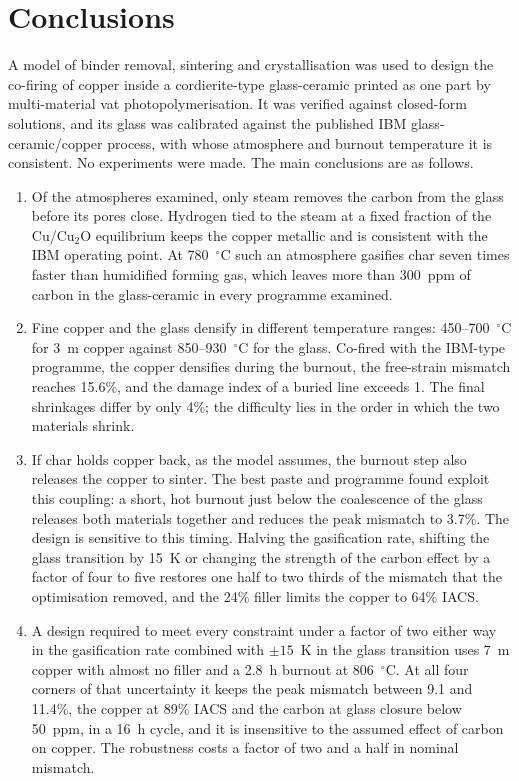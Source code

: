 \section{Conclusions}
\label{sec:conclusions}

A model of binder removal, sintering and crystallisation was used to design the co-firing of copper inside a cordierite-type glass-ceramic printed as one part by multi-material vat photopolymerisation. It was verified against closed-form solutions, and its glass was calibrated against the published IBM glass-ceramic/copper process, with whose atmosphere and burnout temperature it is consistent. No experiments were made. The main conclusions are as follows.

\begin{enumerate}
\item Of the atmospheres examined, only steam removes the carbon from the glass before its pores close. Hydrogen tied to the steam at a fixed fraction of the Cu/Cu$_2$O equilibrium keeps the copper metallic and is consistent with the IBM operating point. At 780~$^\circ$C such an atmosphere gasifies char seven times faster than humidified forming gas, which leaves more than 300~ppm of carbon in the glass-ceramic in every programme examined.
\item Fine copper and the glass densify in different temperature ranges: 450--700~$^\circ$C for 3~\textmu m copper against 850--930~$^\circ$C for the glass. Co-fired with the IBM-type programme, the copper densifies during the burnout, the free-strain mismatch reaches 15.6\%, and the damage index of a buried line exceeds 1. The final shrinkages differ by only 4\%; the difficulty lies in the order in which the two materials shrink.
\item If char holds copper back, as the model assumes, the burnout step also releases the copper to sinter. The best paste and programme found exploit this coupling: a short, hot burnout just below the coalescence of the glass releases both materials together and reduces the peak mismatch to 3.7\%. The design is sensitive to this timing. Halving the gasification rate, shifting the glass transition by 15~K or changing the strength of the carbon effect by a factor of four to five restores one half to two thirds of the mismatch that the optimisation removed, and the 24\% filler limits the copper to 64\% IACS.
\item A design required to meet every constraint under a factor of two either way in the gasification rate combined with $\pm15$~K in the glass transition uses 7~\textmu m copper with almost no filler and a 2.8~h burnout at 806~$^\circ$C. At all four corners of that uncertainty it keeps the peak mismatch between 9.1 and 11.4\%, the copper at 89\% IACS and the carbon at glass closure below 50~ppm, in a 16~h cycle, and it is insensitive to the assumed effect of carbon on copper. The robustness costs a factor of two and a half in nominal mismatch.

\end{enumerate}
